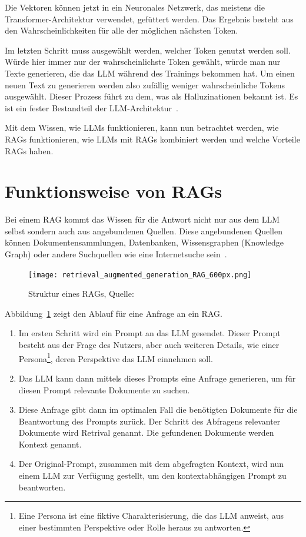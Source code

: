 Die Vektoren können jetzt in ein Neuronales Netzwerk, das meistens die Transformer-Architektur verwendet, gefüttert werden.
Das Ergebnis besteht aus den Wahrscheinlichkeiten für alle der möglichen nächsten Token.

Im letzten Schritt muss ausgewählt werden, welcher Token genutzt werden soll.
Würde hier immer nur der wahrscheinlichste Token gewählt, würde man nur Texte generieren, die das LLM während des Trainings bekommen hat.
Um einen neuen Text zu generieren werden also zufällig weniger wahrscheinliche Tokens ausgewählt.
Dieser Prozess führt zu dem, was als Halluzinationen bekannt ist.
Es ist ein fester Bestandteil der LLM-Architektur~\cite{fraunhofer_iese2025}.

Mit dem Wissen, wie LLMs funktionieren, kann nun betrachtet werden, wie RAGs funktionieren, wie LLMs mit RAGs kombiniert werden und welche Vorteile RAGs haben.

\section{Funktionsweise von RAGs}

Bei einem RAG kommt das Wissen für die Antwort nicht nur aus dem LLM selbst sondern auch aus angebundenen Quellen.
Diese angebundenen Quellen können Dokumentensammlungen, Datenbanken, Wissensgraphen (Knowledge Graph) oder andere Suchquellen wie eine Internetsuche sein~\cite{honroth2024retrieval}.

\begin{figure}[ht!]
    \centering
    \texttt{[image: retrieval\_augmented\_generation\_RAG\_600px.png]}
    \caption[Struktur eines RAGs]{Struktur eines RAGs, Quelle: \cite{honroth2024retrieval}}
    \label{fig:Rag_Structure}
\end{figure}

Abbildung~\ref{fig:Rag_Structure} zeigt den Ablauf für eine Anfrage an ein RAG.
\begin{enumerate}
    \item Im ersten Schritt wird ein Prompt an das LLM gesendet.
    Dieser Prompt besteht aus der Frage des Nutzers, aber auch weiteren Details, wie einer Persona\footnote{Eine Persona ist eine fiktive Charakterisierung, die das LLM anweist, aus einer bestimmten Perspektive oder Rolle heraus zu antworten.}, deren Perspektive das LLM einnehmen soll.
    \item Das LLM kann dann mittels dieses Prompts eine Anfrage generieren, um für diesen Prompt relevante Dokumente zu suchen.
    \item Diese Anfrage gibt dann im optimalen Fall die benötigten Dokumente für die Beantwortung des Prompts zurück.
    Der Schritt des Abfragens relevanter Dokumente wird Retrival genannt.
    Die gefundenen Dokumente werden Kontext genannt.
    \item Der Original-Prompt, zusammen mit dem abgefragten Kontext, wird nun einem LLM zur Verfügung gestellt, um den kontextabhängigen Prompt zu beantworten.
\end{enumerate}
